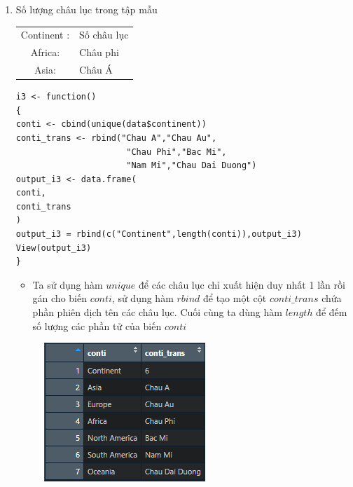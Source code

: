 \documentclass[a4paper]{article}
\theoremstyle{definition}
\begin{document}
\begin{enumerate}[i)]
\begin{enumerate}[1)]
		\item Số lượng châu lục trong tập mẫu
		\begin{center}
			\begin{tabular}{ c l }
				Continent : & Số châu lục \\ 
				Africa: & Châu phi \\ 
				Asia: & Châu Á \\
			\end{tabular}
		\end{center}
		\newpage
	\begin{lstlisting}[frame=single]  
i3 <- function()
{
conti <- cbind(unique(data$continent))
conti_trans <- rbind("Chau A","Chau Au",
                      "Chau Phi","Bac Mi",
                      "Nam Mi","Chau Dai Duong")
output_i3 <- data.frame(
conti,
conti_trans
)
output_i3 = rbind(c("Continent",length(conti)),output_i3)
View(output_i3)
}
	\end{lstlisting}
	
	\begin{itemize}
	    \item Ta sử dụng hàm $unique$ để các châu lục chỉ xuất hiện duy nhất 1 lần rồi gán cho biến $conti$, sử dụng hàm $rbind$ để tạo một cột $conti\_trans$ chứa phần phiên dịch tên các châu lục. Cuối cùng ta dùng hàm $length$ để đếm số lượng các phần tử của biến $conti$
	\end{itemize}
	
	\begin{figure}[h!]
		\begin{center}
		    \includegraphics[]{Images/I/I3.png}
		\end{center}
	\end{figure}
	

\end{enumerate}
\end{enumerate}
\end{document}
